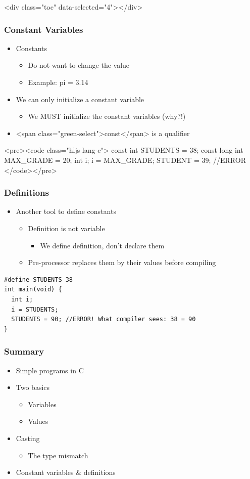 \documentclass{../c-lecture}
\begin{document}
\begin{frame}
  <div class="toc" data-selected="4"></div>
\end{frame}
\begin{frame}
  \frametitle{Constant Variables}
  \begin{itemize}
    \item Constants
    \begin{itemize}
      \item Do not want to change the value
      \item Example: pi = 3.14
    \end{itemize}
    \item We can only initialize a constant variable
    \begin{itemize}
      \item We MUST initialize the constant variables (why?!)
    \end{itemize}
    \item <span class="green-select">const</span> is a qualifier
  \end{itemize}
  <pre><code class="hljs lang-c">
const int STUDENTS = 38;
const long int MAX_GRADE = 20;
int i;
i = MAX_GRADE;
STUDENT = 39; //ERROR
  </code></pre>
\end{frame}
\begin{frame}
  \frametitle{Definitions}
  \begin{itemize}
    \item Another tool to define constants
    \begin{itemize}
      \item Definition is not variable
      \begin{itemize}
        \item We define definition, don’t declare them
      \end{itemize}
      \item Pre-processor replaces them by their values before compiling
    \end{itemize}
  \end{itemize}
  \begin{verbatim}
#define STUDENTS 38
int main(void) {
  int i;
  i = STUDENTS;
  STUDENTS = 90; //ERROR! What compiler sees: 38 = 90
}
  \end{verbatim}
\end{frame}
\begin{frame}
  \frametitle{Summary}
  \begin{itemize}
    \item Simple programs in C
    \item Two basics
    \begin{itemize}
      \item Variables
      \item Values
    \end{itemize}
    \item Casting
    \begin{itemize}
      \item The type mismatch
    \end{itemize}
  \item Constant variables \& definitions
  \end{itemize}
\end{frame}
\end{document}
